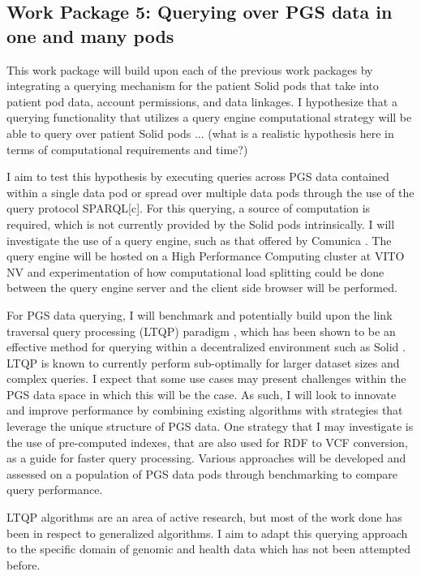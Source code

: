 \documentclass[runningheads]{llncs}
\begin{document}
\subsection{Work Package 5: Querying over PGS data in one and many pods}

This work package will build upon each of the previous work packages by integrating a querying mechanism for the patient Solid pods that take into patient pod data, account permissions, and data linkages. 
I hypothesize that a querying functionality that utilizes a query engine computational strategy will be able to query over patient Solid pods ... (what is a realistic hypothesis here in terms of computational requirements and time?)

I aim to test this hypothesis by executing queries across PGS data contained within a single data pod or spread over multiple data pods through the use of the query protocol SPARQL[c].  
For this querying, a source of computation is required, which is not currently provided by the Solid pods intrinsically.
I will investigate the use of a query engine, such as that offered by Comunica \cite{comunica}.
The query engine will be hosted on a High Performance Computing cluster at VITO NV and experimentation of how computational load splitting could be done between the query engine server and the client side browser will be performed. 

For PGS data querying, I will benchmark and potentially build upon the link traversal query processing (LTQP) paradigm \cite{taelman_evaluation_2023}, which has been shown to be an effective method for querying within a decentralized environment such as Solid \cite{capadisli_solid_nodate}. 
LTQP is known to currently perform sub-optimally for larger dataset sizes and complex queries. 
I expect that some use cases may present challenges within the PGS data space in which this will be the case. 
As such, I will look to innovate and improve performance by combining existing algorithms with strategies that leverage the unique structure of PGS data.
One strategy that I may investigate is the use of pre-computed indexes, that are also used for RDF to VCF conversion, as a guide for faster query processing.
Various approaches will be developed and assessed on a population of PGS data pods through benchmarking to compare query performance. 

LTQP algorithms are an area of active research, but most of the work done has been in respect to generalized algorithms.
I aim to adapt this querying approach to the specific domain of genomic and health data which has not been attempted before. 
\end{document}

